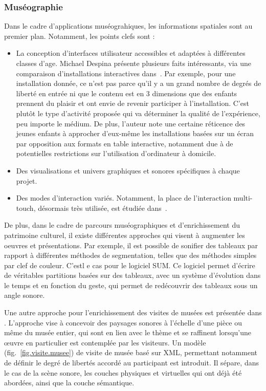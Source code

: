 \documentclass[french,12pt]{article}
\begin{document}
\subsubsection{Muséographie}
Dans le cadre d'applications muséograhiques, les informations spatiales sont au premier plan. Notamment, les points clefs sont : 
\begin{itemize}
    \item La conception d'interfaces utilisateur accessibles et adaptées à différentes classes d'age. 
    Michael Despina présente plusieurs faits intéressants, via une comparaison d'installations interactives dans~\cite{michael_comparative_2010}. Par exemple, pour une installation donnée, ce n'est pas parce qu'il y a un grand nombre de degrés de liberté en entrée ni que le contenu est en 3 dimensions que des enfants prennent du plaisir et ont envie de revenir participer à l'installation. C'est plutôt le type d'activité proposée qui va déterminer la qualité de l'expérience, peu importe le médium. De plus, l'auteur note une certaine réticence des jeunes enfants à approcher d'eux-même les installations basées sur un écran par opposition aux formats en table interactive, notamment due à de potentielles restrictions sur l'utilisation d'ordinateur à domicile.
    \item Des visualisations et univers graphiques et sonores spécifiques à chaque projet.
    \item Des modes d'interaction variés. Notamment, la place de l'interaction multi-touch, désormais très utilisée, est étudiée dans~\cite{kidd_multi-touch_2011}.
\end{itemize}

De plus, dans le cadre de parcours muséographiques et d'enrichissement du patrimoine culturel, il existe différentes approches qui visent à augmenter les oeuvres et présentations. Par exemple, il est possible de sonifier des tableaux par rapport à différentes méthodes de segmentation, telles que des méthodes simples par clef de couleur. C'estl e cas pour le logiciel SUM\cite{adhitya_composing_2012}.
Ce logiciel permet d'écrire de véritables partitions basées sur des tableaux, avec un système d'évolution dans le temps et en fonction du geste, qui permet de redécouvrir des tableaux sous un angle sonore.

Une autre approche pour l'enrichissement des visites de musées est présentée dans \cite{azough_modeet_2014}. L'approche vise à concevoir des paysages sonores à l'échelle d'une pièce ou même du musée entier, qui sont en lien avec le thème et se raffinent lorsqu'une \oe uvre en particulier est contemplée par les visiteurs. Un modèle (fig.~\ref{fig.visite.musee}) de visite de musée basé sur XML, permettant notamment de définir le degré de libertés accordé au participant est introduit. Il sépare, dans le cas de la scène sonore, les couches physiques et virtuelles qui ont déjà été abordées, ainsi que la couche sémantique.
\end{document}
